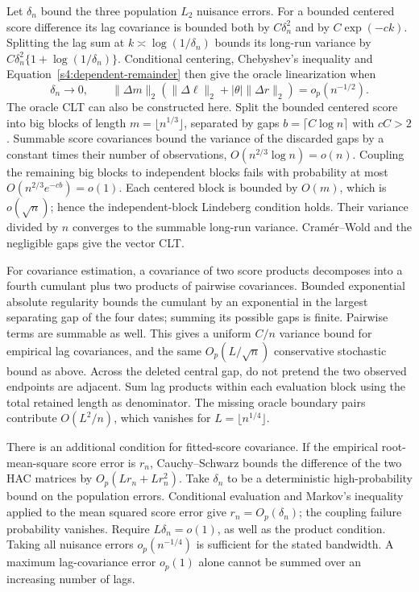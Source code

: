 Let $\delta_n$ bound the three population $L_2$ nuisance errors. For a
bounded centered score difference its lag covariance is bounded both by
$C\delta_n^2$ and by $C\exp(-ck)$. Splitting the lag sum at
$k\asymp\log(1/\delta_n)$ bounds its long-run variance by
$C\delta_n^2\{1+\log(1/\delta_n)\}$. Conditional centering, Chebyshev's
inequality and Equation~\eqref{s4:dependent-remainder} then give the oracle
linearization when
\[
 \delta_n\to0,\qquad
 \|\Delta m\|_2(\|\Delta\ell\|_2+|\theta|\|\Delta r\|_2)
       =o_p(n^{-1/2}).
\]
The oracle CLT can also be constructed here. Split the bounded centered
score into big blocks of length $m=\lfloor n^{1/3}\rfloor$, separated
by gaps $b=\lceil C\log n\rceil$ with $cC>2$. Summable score
covariances bound the variance of the discarded gaps by a constant times
their number of observations, $O(n^{2/3}\log n)=o(n)$. Coupling the
remaining big blocks to independent blocks fails with probability at most
$O(n^{2/3}e^{-cb})=o(1)$. Each centered block is bounded by $O(m)$,
which is $o(\sqrt n)$; hence the independent-block Lindeberg condition
holds. Their variance divided by $n$ converges to the summable long-run
variance. Cram\'er--Wold and the negligible gaps give the vector CLT.

For covariance estimation, a covariance of two score products decomposes
into a fourth cumulant plus two products of pairwise covariances. Bounded
exponential absolute regularity bounds the cumulant by an exponential in
the largest separating gap of the four dates; summing its possible gaps
is finite. Pairwise terms are summable as well. This gives a uniform
$C/n$ variance bound for empirical lag covariances, and the same
$O_p(L/\sqrt n)$ conservative stochastic bound as above. Across the deleted central gap,
do not pretend the two observed endpoints are adjacent. Sum lag products
within each evaluation block using the total retained length as denominator.
The missing oracle boundary pairs contribute $O(L^2/n)$, which vanishes
for $L=\lfloor n^{1/4}\rfloor$.

There is an additional condition for fitted-score covariance. If the
empirical root-mean-square score error is $r_n$, Cauchy--Schwarz bounds
the difference of the two HAC matrices by $O_p(Lr_n+Lr_n^2)$.
Take $\delta_n$ to be a deterministic high-probability bound on the
population errors. Conditional evaluation and Markov's inequality applied
to the mean squared score error give $r_n=O_p(\delta_n)$; the coupling
failure probability vanishes. Require $L\delta_n=o(1)$, as well as the product condition.
Taking all nuisance errors $o_p(n^{-1/4})$ is sufficient for the stated
bandwidth. A maximum lag-covariance error $o_p(1)$ alone cannot be
summed over an increasing number of lags.

